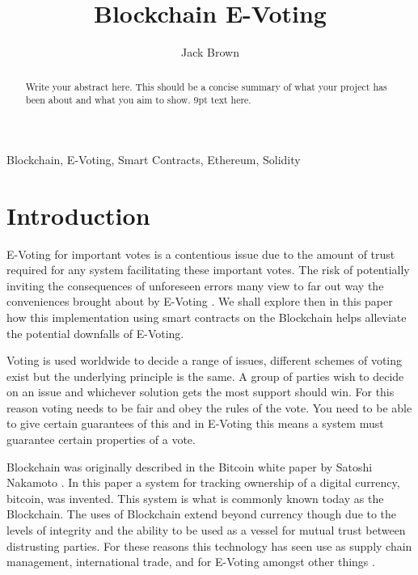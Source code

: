 \documentclass{entcs}
\begin{document}
\begin{frontmatter}

\title{Blockchain E-Voting}
\author{Jack Brown}
\address{School of Computing Science, Newcastle University, UK} 

\begin{abstract} 
Write your abstract here. This should be a concise summary of what your project has been about and what you aim to show. 9pt text here.
\end{abstract}

\begin{keyword}
Blockchain, E-Voting, Smart Contracts, Ethereum, Solidity
\end{keyword}

\end{frontmatter}

\section{Introduction}
E-Voting for important votes is a contentious issue due to the amount of trust required for any system facilitating these important votes. The risk of potentially inviting the consequences of unforeseen errors many view to far out way the conveniences brought about by E-Voting \cite{lauer2004risk}. We shall explore then in this paper how this implementation using smart contracts on the Blockchain helps alleviate the potential downfalls of E-Voting.

Voting is used worldwide to decide a range of issues, different schemes of voting exist but the underlying principle is the same. A group of parties wish to decide on an issue and whichever solution gets the most support should win. For this reason voting needs to be fair and obey the rules of the vote. You need to be able to give certain guarantees of this and in E-Voting this means a system must guarantee certain properties of a vote.

Blockchain was originally described in the Bitcoin white paper by Satoshi Nakamoto \cite{BTCWhitepaper}. In this paper a system for tracking ownership of a digital currency, bitcoin, was invented. This system is what is commonly known today as the Blockchain. The uses of Blockchain extend beyond currency though due to the levels of integrity and the ability to be used as a vessel for mutual trust between distrusting parties. For these reasons this technology has seen use as supply chain management, international trade, and for E-Voting amongst other things \cite{wust2018need}.
\end{document}
